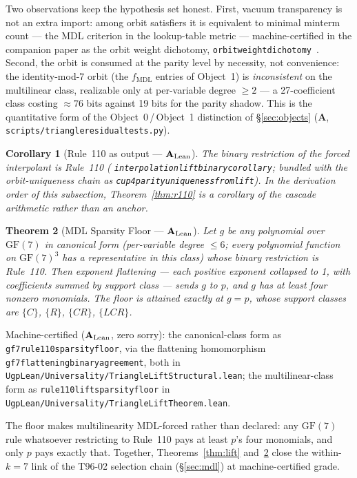\documentclass[11pt]{article}
\newtheorem{theorem}{Theorem}[section]
\newtheorem{corollary}[theorem]{Corollary}
\theoremstyle{remark}
\newcommand{\GF}[1]{\ensuremath{\mathrm{GF}(#1)}}
\newcommand{\lean}[1]{%
  \penalty-100
  \begingroup\def\_{\textunderscore\allowbreak}\texttt{#1}\endgroup}
\newcommand{\fmdl}{\ensuremath{f_{\mathrm{MDL}}}}
\newcommand{\CatA}{\textbf{A}}
\newcommand{\CatAL}{\texorpdfstring{\ensuremath{\textbf{A}_{\rm Lean}}}{A-Lean}}
\begin{document}
\medskip
Two observations keep the hypothesis set honest. First, vacuum
transparency is not an extra import: among orbit satisfiers it is
equivalent to minimal minterm count --- the MDL criterion in the
lookup-table metric --- machine-certified in the companion paper as the
orbit weight dichotomy,
\lean{orbit\_weight\_dichotomy}~\cite{SpivackCompUniversality}. Second,
the orbit is consumed at the parity level by necessity, not convenience:
the identity-mod-7 orbit (the $\fmdl{}$ entries of Object~1) is
\emph{inconsistent} on the multilinear class, realizable only at
per-variable degree ${\geq}2$ --- a 27-coefficient class costing
${\approx}76$ bits against 19 bits for the parity shadow. This is the
quantitative form of the Object~0\,/\,Object~1 distinction of
§\ref{sec:objects} (\CatA{},
\lean{scripts/triangle\_residual\_tests.py}).

\begin{corollary}[Rule~110 as output --- \CatAL{}]
\label{cor:liftbinary}
The binary restriction of the forced interpolant is Rule~110
(\lean{interpolation\_lift\_binary\_corollary}; bundled with the
orbit-uniqueness chain as \lean{cup4\_parity\_uniqueness\_from\_lift}).
In the derivation order of this subsection, Theorem~\ref{thm:r110} is a
corollary of the cascade arithmetic rather than an anchor.
\end{corollary}

\begin{theorem}[MDL Sparsity Floor --- \CatAL{}]
\label{thm:sparsityfloor}
Let $g$ be any polynomial over $\GF{7}$ in canonical form (per-variable
degree ${\leq}6$; every polynomial function on $\GF{7}^{3}$ has a
representative in this class) whose binary restriction is Rule~110. Then
exponent flattening --- each positive exponent collapsed to 1, with
coefficients summed by support class --- sends $g$ to $p$, and $g$ has at
least four nonzero monomials. The floor is attained exactly at $g = p$,
whose support classes are $\{C\}$, $\{R\}$, $\{CR\}$, $\{LCR\}$.
\end{theorem}

{\sloppy\noindent Machine-certified (\CatAL{}, zero sorry): the
canonical-class form as \lean{gf7\_rule110\_sparsity\_floor}, via the
flattening homomorphism \lean{gf7\_flattening\_binary\_agreement}, both in
\lean{UgpLean/Universality/TriangleLiftStructural.lean}; the
multilinear-class form as \lean{rule110\_lift\_sparsity\_floor} in
\lean{UgpLean/Universality/TriangleLiftTheorem.lean}.\par}
The floor makes multilinearity MDL-forced rather than declared: any
$\GF{7}$ rule whatsoever restricting to Rule~110 pays at least $p$'s four
monomials, and only $p$ pays exactly that. Together,
Theorems~\ref{thm:lift} and~\ref{thm:sparsityfloor} close the
within-$k{=}7$ link of the T96-02 selection chain (§\ref{sec:mdl}) at
machine-certified grade.
\end{document}

